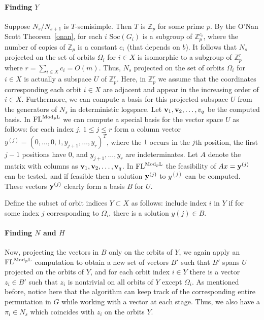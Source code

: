 \documentclass[11pt]{article}
\newcommand{\Mod}[1]{\ensuremath{\mathrm{Mod}_{#1}\mathrm{L}}}
\newcommand{\FL}{\mbox{\rm FL}}
\newcommand{\Z}{\mathbb{Z}}
\newcommand{\y}{\mbox{\bf y}}
\renewcommand{\v}{\mbox{\bf v}}
\newcommand{\Soc}[1]{\ensuremath{\mathrm{Soc}\left(#1\right)}}
\begin{document}
\paragraph{Finding $Y$} 
Suppose $N_s/N_{s+1}$ is $T$-semisimple. Then $T$ is $\Z_p$ for some
prime $p$. By the O'Nan Scott Theorem~\ref{onan}, for each $i$
$\Soc{G_i}$ is a subgroup of $\Z_p^{c_i}$, where the number of copies
of $\Z_p$ is a constant $c_i$ (that depends on $b$). It follows that
$N_s$ projected on the set of orbits $\Omega_i$ for $i\in X$ is
isomorphic to a subgroup of $\Z_p^r$ where $r=\sum_{i\in
X}c_i=O(m)$. Thus, $N_s$ projected on the set of orbits $\Omega_i$ for
$i\in X$ is actually a subspace $U$ of $\Z_p^r$.  Here, in $\Z_p^r$ we
assume that the coordinates corresponding each orbit $i\in X$ are
adjacent and appear in the increasing order of $i\in X$. Furthermore,
we can compute a basis for this projected subspace $U$ from the
generators of $N_s$ in deterministic logspace. Let
$\v_1,\v_2,\ldots,v_q$ be the computed basis. In $\FL^{\Mod{p}}$ we
can compute a special basis for the vector space $U$ as follows: for
each index $j$, $1\leq j\leq r$ form a column vector
$y^{(j)}=(0,\ldots,0,1,y_{j+1},\ldots,y_r)^T$, where the $1$ occurs in
the $j$th position, the first $j-1$ positions have $0$, and
$y_{j+1},\ldots,y_r$ are indeterminates. Let $A$ denote the matrix
with columns as $\v_1,\v_2,\ldots,\v_q$. In $\FL^{\Mod{p}}$ the
feasibility of $Ax=\y^{(j)}$ can be tested, and if feasible then a
solution $\y^{(j)}$ to $y^{(j)}$ can be computed. These vectors
$\y^{(j)}$ clearly form a basis $B$ for $U$.

Define the subset of orbit indices $Y\subset X$ as follows: include
index $i$ in $Y$ if for some index $j$ corresponding to $\Omega_i$,
there is a solution $y{(j)}\in B$. 

\paragraph{Finding $N$ and $H$}
Now, projecting the vectors in $B$ only on the orbits of $Y$, we again
apply an $\FL^{\Mod{p}}$ computation to obtain a new set of vectors
$B'$ such that $B'$ spans $U$ projected on the orbits of $Y$, and for
each orbit index $i\in Y$ there is a vector $z_i\in B'$ such that
$z_i$ is nontrivial on all orbits of $Y$ except $\Omega_i$.  As
mentioned before, notice here that the algorithm can keep track of the
corresponding entire permutation in $G$ while working with a vector at
each stage. Thus, we also have a $\pi_i\in N_s$ which coincides with
$z_i$ on the orbits $Y$.
\end{document}
